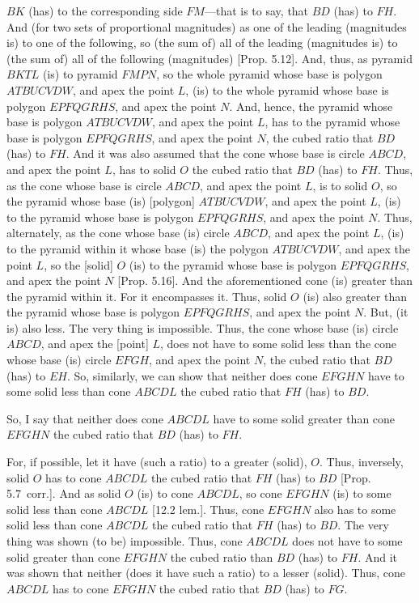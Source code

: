 \begin{Parallel}{}{}
{ $BK$ (has) to the corresponding side $FM$---that is to say, that $BD$ (has) to $FH$. And (for two sets of proportional magnitudes) as one of the leading
 (magnitudes is) to one of the following, so (the sum of) all of the leading 
 (magnitudes is) to (the sum of) all of the
 following (magnitudes) [Prop. 5.12]. And, thus, as pyramid $BKTL$ (is) to pyramid $FMPN$,
 so the whole pyramid whose base is polygon $ATBUCVDW$, and apex the point $L$, (is) to the whole pyramid
 whose base is polygon $EPFQGRHS$, and apex the point $N$. And, hence, the pyramid whose base is polygon $ATBUCVDW$, and apex the point $L$, has to the pyramid
 whose base is polygon $EPFQGRHS$, and apex the point $N$, the cubed ratio that $BD$ (has) to $FH$. And it was also assumed that the cone whose base is circle $ABCD$, and apex the point $L$, has to solid $O$ the cubed ratio that $BD$ (has)
 to $FH$. Thus, as the cone whose base is circle $ABCD$, and apex the point $L$, is to solid $O$, so the pyramid
 whose base (is) [polygon] $ATBUCVDW$, and apex the point $L$, (is) to the pyramid whose base is polygon $EPFQGRHS$, and apex the point $N$. Thus, alternately, as the cone whose base (is) circle $ABCD$, and apex the point $L$, (is)
 to the pyramid within it whose base (is) the polygon $ATBUCVDW$, and apex the point $L$, so the [solid] $O$ (is)
 to the pyramid whose base is polygon  $EPFQGRHS$, and apex the point $N$ [Prop. 5.16]. And the aforementioned cone (is)
 greater than the pyramid within it. For it encompasses it. Thus, solid $O$ (is) also greater than the pyramid whose base is polygon  $EPFQGRHS$, and apex the point $N$. But, (it is) also less. The very thing is impossible. Thus, the cone whose
 base (is) circle $ABCD$, and apex the [point] $L$, does not have to some solid less than the cone whose
 base (is) circle $EFGH$, and apex the point $N$, the cubed ratio that $BD$ (has) to $EH$.  So, similarly,
 we can show that neither does cone $EFGHN$ have to some solid less than cone $ABCDL$ the cubed
 ratio that $FH$ (has) to $BD$.
 
So, I say that neither does cone $ABCDL$ have to some solid greater than cone $EFGHN$ the cubed ratio
that $BD$ (has) to $FH$.

For, if possible, let it have (such a ratio) to a greater (solid), $O$. Thus, inversely,  solid $O$ has to
cone $ABCDL$ the cubed ratio that $FH$ (has) to $BD$ [Prop. 5.7~corr.]. 
And as solid $O$ (is) to cone $ABCDL$, so cone $EFGHN$ (is) to some solid less than cone
$ABCDL$ [12.2 lem.]. Thus, cone $EFGHN$ also has to some solid less than cone $ABCDL$ the cubed
ratio that $FH$ (has) to $BD$. The very thing was shown (to be) impossible. Thus, cone $ABCDL$
does not have to some solid greater than cone $EFGHN$ the cubed ratio than $BD$ (has) to $FH$. And
it was shown that neither (does it have such a ratio) to a lesser (solid).  Thus, cone $ABCDL$ has
to cone $EFGHN$ the cubed ratio that $BD$ (has) to $FG$.

}
\end{Parallel}
